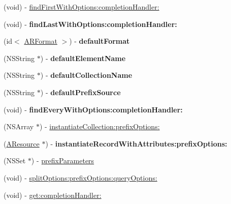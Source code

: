 \begin{DoxyCompactItemize}
\item 
(void) -\/ \hyperlink{a00001_a72d8a5a94f38f8662ff03bb916b6f755}{find\-First\-With\-Options\-:completion\-Handler\-:}
\item 
\hypertarget{a00001_ad44837f4604170cab4ac22abd8aa1596}{
(void) -\/ {\bfseries find\-Last\-With\-Options\-:completion\-Handler\-:}}
\label{a00001_ad44837f4604170cab4ac22abd8aa1596}

\item 
\hypertarget{a00001_a92af873b04ae2aadc503f5e2c7593e71}{
(id$<$ \hyperlink{a00003}{\-A\-R\-Format} $>$) -\/ {\bfseries default\-Format}}
\label{a00001_a92af873b04ae2aadc503f5e2c7593e71}

\item 
\hypertarget{a00001_a0b522cfe9bdb4817ec394c7904308945}{
(\-N\-S\-String $\ast$) -\/ {\bfseries default\-Element\-Name}}
\label{a00001_a0b522cfe9bdb4817ec394c7904308945}

\item 
\hypertarget{a00001_aa8de933ea23c92706286550e7d90b1f9}{
(\-N\-S\-String $\ast$) -\/ {\bfseries default\-Collection\-Name}}
\label{a00001_aa8de933ea23c92706286550e7d90b1f9}

\item 
\hypertarget{a00001_a3cbfeb0c843338934dc6cc4023e6f8f4}{
(\-N\-S\-String $\ast$) -\/ {\bfseries default\-Prefix\-Source}}
\label{a00001_a3cbfeb0c843338934dc6cc4023e6f8f4}

\item 
\hypertarget{a00001_a9a5229ce622944d3983fdd2ae47ccd7b}{
(void) -\/ {\bfseries find\-Every\-With\-Options\-:completion\-Handler\-:}}
\label{a00001_a9a5229ce622944d3983fdd2ae47ccd7b}

\item 
(\-N\-S\-Array $\ast$) -\/ \hyperlink{a00001_aaab693bcfa509ef3ddf898592c3edf01}{instantiate\-Collection\-:prefix\-Options\-:}
\item 
\hypertarget{a00001_a106cd84052fee3936be9b0fbcd44820b}{
(\hyperlink{a00002}{\-A\-Resource} $\ast$) -\/ {\bfseries instantiate\-Record\-With\-Attributes\-:prefix\-Options\-:}}
\label{a00001_a106cd84052fee3936be9b0fbcd44820b}

\item 
(\-N\-S\-Set $\ast$) -\/ \hyperlink{a00001_a73105d9ed9fb6086531b2c7693ff7d27}{prefix\-Parameters}
\item 
(void) -\/ \hyperlink{a00001_ab9ebe70524801d91eb06a260b8fbfc72}{split\-Options\-:prefix\-Options\-:query\-Options\-:}
\item 
(void) -\/ \hyperlink{a00001_ac92f285175cda9bba386bf57f3786106}{get\-:completion\-Handler\-:}
\end{DoxyCompactItemize}
